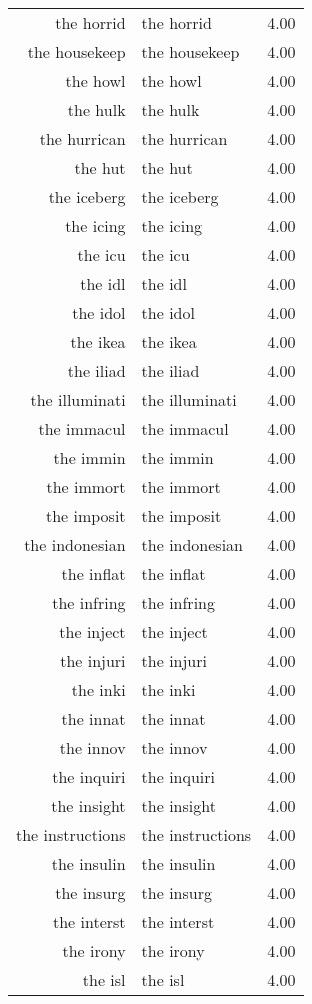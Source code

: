 \begin{table}[ht]
\begin{tabular}{rlr}
  the horrid & the horrid & 4.00 \\ 
  the housekeep & the housekeep & 4.00 \\ 
  the howl & the howl & 4.00 \\ 
  the hulk & the hulk & 4.00 \\ 
  the hurrican & the hurrican & 4.00 \\ 
  the hut & the hut & 4.00 \\ 
  the iceberg & the iceberg & 4.00 \\ 
  the icing & the icing & 4.00 \\ 
  the icu & the icu & 4.00 \\ 
  the idl & the idl & 4.00 \\ 
  the idol & the idol & 4.00 \\ 
  the ikea & the ikea & 4.00 \\ 
  the iliad & the iliad & 4.00 \\ 
  the illuminati & the illuminati & 4.00 \\ 
  the immacul & the immacul & 4.00 \\ 
  the immin & the immin & 4.00 \\ 
  the immort & the immort & 4.00 \\ 
  the imposit & the imposit & 4.00 \\ 
  the indonesian & the indonesian & 4.00 \\ 
  the inflat & the inflat & 4.00 \\ 
  the infring & the infring & 4.00 \\ 
  the inject & the inject & 4.00 \\ 
  the injuri & the injuri & 4.00 \\ 
  the inki & the inki & 4.00 \\ 
  the innat & the innat & 4.00 \\ 
  the innov & the innov & 4.00 \\ 
  the inquiri & the inquiri & 4.00 \\ 
  the insight & the insight & 4.00 \\ 
  the instructions & the instructions & 4.00 \\ 
  the insulin & the insulin & 4.00 \\ 
  the insurg & the insurg & 4.00 \\ 
  the interst & the interst & 4.00 \\ 
  the irony & the irony & 4.00 \\ 
  the isl & the isl & 4.00 \\ 

\end{tabular}
\end{table}
